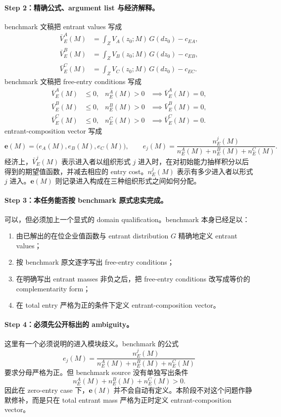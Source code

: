 \paragraph{Step 2：精确公式、argument list 与经济解释。}
benchmark 文稿把 entrant values 写成
\begin{align*}
\bar V_E^A(M)&=\int_Z V_A(z_0;M)\,G(dz_0)-c_{EA},\\
\bar V_E^B(M)&=\int_Z V_B(z_0;M)\,G(dz_0)-c_{EB},\\
\bar V_E^C(M)&=\int_Z V_C(z_0;M)\,G(dz_0)-c_{EC}.
\end{align*}
benchmark 文稿把 free-entry conditions 写成
\begin{align*}
\bar V_E^A(M) &\le 0, & n_E^A(M)>0 &\implies \bar V_E^A(M)=0,\\
\bar V_E^B(M) &\le 0, & n_E^B(M)>0 &\implies \bar V_E^B(M)=0,\\
\bar V_E^C(M) &\le 0, & n_E^C(M)>0 &\implies \bar V_E^C(M)=0.
\end{align*}
entrant-composition vector 写成
\[
\mathbf e(M)=\bigl(e_A(M),e_B(M),e_C(M)\bigr),
\qquad
e_j(M)=\frac{n_E^j(M)}{n_E^A(M)+n_E^B(M)+n_E^C(M)}.
\]
经济上，$\bar V_E^j(M)$ 表示进入者以组织形式 $j$ 进入时，在对初始能力抽样积分以后得到的期望值函数，并减去相应的 entry cost。$n_E^j(M)$ 表示有多少进入者以形式 $j$ 进入。$\mathbf e(M)$ 则记录进入构成在三种组织形式之间如何分配。

\paragraph{Step 3：本任务能否按 benchmark 原式忠实完成。}
可以，但必须加上一个显式的 domain qualification。benchmark 本身已经足以：
\begin{enumerate}
    \item 由已解出的在位企业值函数与 entrant distribution $G$ 精确地定义 entrant values；
    \item 按 benchmark 原文逐字写出 free-entry conditions；
    \item 在明确写出 entrant masses 非负之后，把 free-entry conditions 改写成等价的 complementarity form；
    \item 在 total entry 严格为正的条件下定义 entrant-composition vector。
\end{enumerate}

\paragraph{Step 4：必须先公开标出的 ambiguity。}
这里有一个必须说明的进入模块歧义。benchmark 的公式
\[
e_j(M)=\frac{n_E^j(M)}{n_E^A(M)+n_E^B(M)+n_E^C(M)}
\]
要求分母严格为正。但 benchmark source 没有单独写出条件
\[
n_E^A(M)+n_E^B(M)+n_E^C(M)>0.
\]
因此在 zero-entry case 下，$\mathbf e(M)$ 并不会自动有定义。本阶段不对这个问题作静默修补，而是只在 total entrant mass 严格为正时定义 entrant-composition vector。

